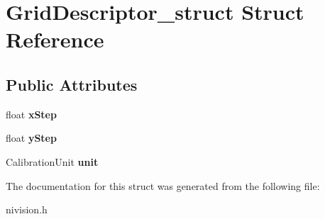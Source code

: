 \hypertarget{structGridDescriptor__struct}{\section{\-Grid\-Descriptor\-\_\-struct \-Struct \-Reference}
\label{structGridDescriptor__struct}
}
\subsection*{\-Public \-Attributes}
\begin{DoxyCompactItemize}
\item 
\hypertarget{structGridDescriptor__struct_afa63ccaefe7b11e51045f801cd92dd5c}{float {\bfseries x\-Step}}\label{structGridDescriptor__struct_afa63ccaefe7b11e51045f801cd92dd5c}

\item 
\hypertarget{structGridDescriptor__struct_ae9333f8fa28f4d4eb162a39b31b7e1b2}{float {\bfseries y\-Step}}\label{structGridDescriptor__struct_ae9333f8fa28f4d4eb162a39b31b7e1b2}

\item 
\hypertarget{structGridDescriptor__struct_a18e724ae890b8853127c64ced464da85}{\-Calibration\-Unit {\bfseries unit}}\label{structGridDescriptor__struct_a18e724ae890b8853127c64ced464da85}

\end{DoxyCompactItemize}


\-The documentation for this struct was generated from the following file\-:\begin{DoxyCompactItemize}
\item 
nivision.\-h\end{DoxyCompactItemize}
